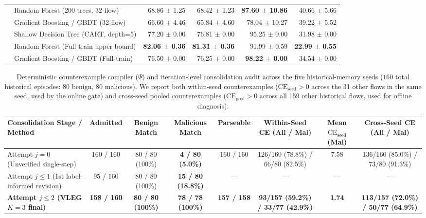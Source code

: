 \documentclass[10pt,a4paper,onecolumn]{article}
\theoremstyle{definition}
\theoremstyle{remark}
\begin{document}
\begin{table}[!t]
\begin{adjustbox}{max width=\linewidth}
\begin{tabular}{llrrrr}
 & Random Forest (200 trees, 32-flow) & 68.86 $\pm$ 1.25 & 68.42 $\pm$ 1.23 & \textbf{87.60 $\pm$ 10.86} & 40.66 $\pm$ 5.66 \\
 & Gradient Boosting / GBDT (32-flow) & 66.60 $\pm$ 4.46 & 65.84 $\pm$ 4.60 & 78.04 $\pm$ 10.27 & 39.22 $\pm$ 5.52 \\
\midrule
{}
 & Shallow Decision Tree (CART, depth=5) & 77.20 $\pm$ 0.00 & 76.81 $\pm$ 0.00 & 95.25 $\pm$ 0.00 & 31.98 $\pm$ 0.00 \\
 & Random Forest (Full-train upper bound) & \textbf{82.06 $\pm$ 0.36} & \textbf{81.31 $\pm$ 0.36} & 91.99 $\pm$ 0.59 & \textbf{22.99 $\pm$ 0.55} \\
 & Gradient Boosting / GBDT (Full-train) & 76.50 $\pm$ 0.00 & 76.25 $\pm$ 0.00 & \textbf{98.22 $\pm$ 0.00} & 34.54 $\pm$ 0.00 \\
\bottomrule
\end{tabular}
\end{adjustbox}
\end{table}

\begin{table}[!t]
\centering
\caption{Deterministic counterexample compiler ($\Psi$) and iteration-level consolidation audit across the five historical-memory seeds ($160$ total historical episodes: $80$ benign, $80$ malicious). We report both within-seed counterexamples ($\mathrm{CE}_{\mathrm{seed}} > 0$ across the 31 other flows in the same seed, used by the online gate) and cross-seed pooled counterexamples ($\mathrm{CE}_{\mathrm{pool}} > 0$ across all 159 other historical flows, used for offline diagnosis).}
\label{tab:counterexample_audit}
\small
\begin{adjustbox}{max width=\linewidth}
\begin{tabular}{lccccccc}
\toprule
\textbf{Consolidation Stage / Method} & \textbf{Admitted} & \textbf{Benign Match} & \textbf{Malicious Match} & \textbf{Parseable} & \textbf{Within-Seed CE (All / Mal)} & \textbf{Mean $\mathrm{CE}_{\mathrm{seed}}$ (Mal)} & \textbf{Cross-Seed CE (All / Mal)} \\
\midrule
Attempt $j{=}0$ (Unverified single-step) & 160 / 160 & 80 / 80 (100\%) & \textbf{4 / 80 (5.0\%)} & 160 / 160 & 126/160 (78.8\%) / 66/80 (82.5\%) & 7.58 & 136/160 (85.0\%) / 73/80 (91.3\%) \\
Attempt $j{\le}1$ (1st label-informed revision) & 95 / 160 & 80 / 80 (100\%) & \textbf{15 / 80 (18.8\%)} & --- & --- & --- & --- \\
\textbf{Attempt $j{\le}2$ (VLEG $K{=}3$ final)} & \textbf{158 / 160} & \textbf{80 / 80 (100\%)} & \textbf{78 / 78 (100\%)} & \textbf{157 / 158} & \textbf{93/157 (59.2\%) / 33/77 (42.9\%)} & \textbf{1.74} & \textbf{113/157 (72.0\%) / 50/77 (64.9\%)} \\
\bottomrule
\end{tabular}
\end{adjustbox}
\end{table}
\end{document}
